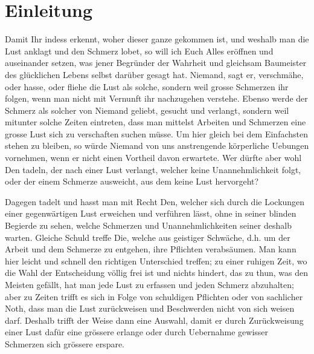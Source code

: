 \chapter{Einleitung}
Damit Ihr indess erkennt, woher dieser ganze  gekommen ist, und weshalb man die Lust anklagt und den Schmerz lobet, so will ich Euch Alles eröffnen und auseinander setzen, was jener Begründer der Wahrheit und gleichsam Baumeister des glücklichen Lebens selbst darüber gesagt hat. Niemand, sagt er, verschmähe, oder hasse, oder fliehe die Lust als solche, sondern weil grosse Schmerzen ihr folgen, wenn man nicht mit Vernunft ihr nachzugehen verstehe. Ebenso werde der Schmerz als solcher von Niemand geliebt, gesucht und verlangt, sondern weil mitunter solche Zeiten eintreten, dass man mittelst Arbeiten und Schmerzen eine grosse Lust sich zu verschaften suchen müsse. Um hier gleich bei dem Einfachsten stehen zu bleiben, so würde Niemand von uns anstrengende körperliche Uebungen vornehmen, wenn er nicht einen Vortheil davon erwartete. Wer dürfte aber wohl Den tadeln, der nach einer Lust verlangt, welcher keine Unannehmlichkeit folgt, oder der einem Schmerze ausweicht, aus dem keine Lust hervorgeht?

Dagegen tadelt und hasst man mit Recht Den, welcher sich durch die Lockungen einer gegenwärtigen Lust erweichen und verführen lässt, ohne in seiner blinden Begierde zu sehen, welche Schmerzen und Unannehmlichkeiten seiner deshalb warten. Gleiche Schuld treffe Die, welche aus geistiger Schwäche, d.h. um der Arbeit und dem Schmerze zu entgehen, ihre Pflichten verabsäumen. Man kann hier leicht und schnell den richtigen Unterschied treffen; zu einer ruhigen Zeit, wo die Wahl der Entscheidung völlig frei ist und nichts hindert, das zu thun, was den Meisten gefällt, hat man jede Lust zu erfassen und jeden Schmerz abzuhalten; aber zu Zeiten trifft es sich in Folge von schuldigen Pflichten oder von sachlicher Noth, dass man die Lust zurückweisen und Beschwerden nicht von sich weisen darf. Deshalb trifft der Weise dann eine Auswahl, damit er durch Zurückweisung einer Lust dafür eine grössere erlange oder durch Uebernahme gewisser Schmerzen sich grössere erspare.